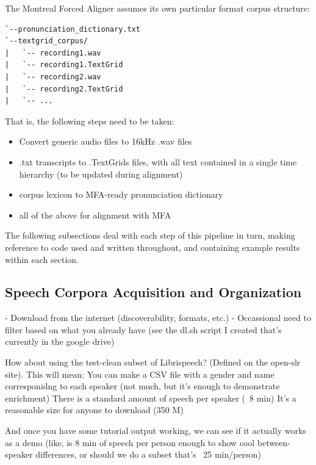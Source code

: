 \documentclass[11pt]{article}
\begin{document}
The Montreal Forced Aligner\cite{mcauliffe_montreal_nodate} assumes its own particular format corpus structure:

\begin{singlespace}
\begin{verbatim}
`--pronunciation_dictionary.txt
`--textgrid_corpus/
|   `-- recording1.wav
|   `-- recording1.TextGrid
|   `-- recording2.wav
|   `-- recording2.TextGrid
|   `-- ...
\end{verbatim}
\end{singlespace}

That is, the following steps need to be taken: 

\begin{singlespace}
\begin{itemize}
  \item Convert generic audio files to 16kHz .wav files
  \item .txt transcripts to .TextGrids files, with all text contained in a single time hierarchy (to be updated during alignment)
  \item corpus lexicon to MFA-ready pronunciation dictionary
  \item all of the above for alignment with MFA
\end{itemize}
\end{singlespace}

The following subsections deal with each step of this pipeline in turn, making reference to code used and written throughout, and containing example results within each section.

\subsection{Speech Corpora Acquisition and Organization}

- Download from the internet (discoverability, formats, etc.)
- Occassional need to filter based on what you already have (see the dl.sh script I created that's currently in the google drive)

How about using the test-clean subset of Librispeech? (Defined on the open-slr site). This will mean:
You can make a CSV file with a gender and name corresponidng to each speaker (not much, but it's enough to demonstrate enrichment)
There is a standard amount of speech per speaker (~8 min)
It's a reasonable size for anyone to download (350 M)

And once you have some tutorial output working, we can see if it actually works as a demo (like, is 8 min of speech per person enough to show cool between-speaker differences, or should we do a subset that's ~25 min/person)
\end{document}
